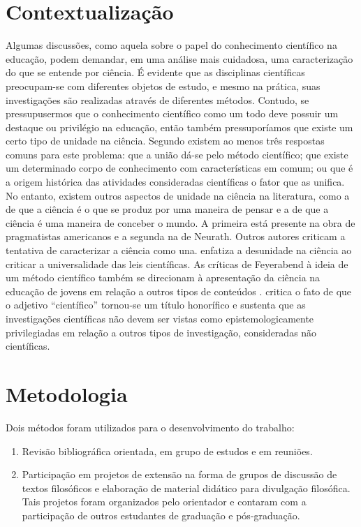 \documentclass[12pt]{report}
\begin{document}
		\section*{Contextualização}		
		Algumas discussões, como aquela sobre o papel do conhecimento científico na educação, podem demandar, em uma análise mais cuidadosa, uma caracterização do que se entende por ciência.
		É evidente que as disciplinas científicas preocupam-se com diferentes objetos de estudo, e mesmo na prática, suas investigações são realizadas através de diferentes métodos.
		Contudo, se pressupusermos que o conhecimento científico como um todo deve possuir um destaque ou privilégio na educação, então também pressuporíamos que existe um certo tipo de unidade na ciência.
		Segundo \textcite{cunha-unidade} existem ao menos três respostas comuns para este problema: que a união dá-se pelo método científico; que existe um determinado corpo de conhecimento com características em comum; ou que é a origem histórica das atividades consideradas científicas o fator que as unifica.
		No entanto, existem outros aspectos de unidade na ciência na literatura, como a de que a ciência é o que se produz por uma maneira de pensar e a de que a ciência é uma maneira de conceber o mundo.
		A primeira está presente na obra de pragmatistas americanos e a segunda na de Neurath.
		Outros autores criticam a tentativa de caracterizar a ciência como una.
		\textcite{cartwright-dappled-world} enfatiza a desunidade na ciência ao criticar a universalidade das leis científicas.
		As críticas de Feyerabend à ideia de um método científico também se direcionam à apresentação da ciência na educação de jovens em relação a outros tipos de conteúdos \cite{feyerabend-against-method, feyerabend-science-free-society}.
		\textcite{haack-defending-science} critica o fato de que o adjetivo “científico” tornou-se um título honorífico e sustenta que as investigações científicas não devem ser vistas como epistemologicamente privilegiadas em relação a outros tipos de investigação, consideradas não científicas.
	
		\section*{Metodologia}
		
		Dois métodos foram utilizados para o desenvolvimento do trabalho:
		
		\begin{enumerate}
			\item Revisão bibliográfica orientada, em grupo de estudos e em reuniões.
			\item Participação em projetos de extensão na forma de grupos de discussão de textos filosóficos e elaboração de material didático para divulgação filosófica.
			Tais projetos foram organizados pelo orientador e contaram com a participação de outros estudantes de graduação e pós-graduação.
		\end{enumerate}
\end{document}

